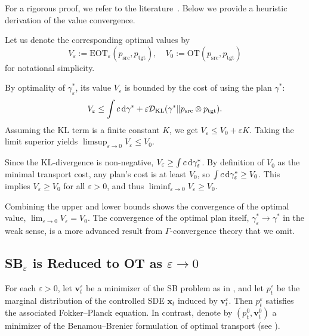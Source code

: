 {For a rigorous proof, we refer to the literature~\citep{mikami2008optimal, peyre2019computational}. Below we provide a heuristic derivation of the value convergence.

Let us denote the corresponding optimal values by
\[
V_\varepsilon := \mathrm{EOT}_\varepsilon(p_{\mathrm{src}}, p_{\mathrm{tgt}}), \quad
V_0 := \mathrm{OT}(p_{\mathrm{src}}, p_{\mathrm{tgt}})
\]
for notational simplicity. 


 By optimality of $\gamma^*_\varepsilon$, its value $V_\varepsilon$ is bounded by the cost of using the plan $\gamma^*$:
\[
    V_\varepsilon \leq \int c  \mathop{}\!\mathrm{d}\gamma^* + \varepsilon \mathcal{D}_{\text{KL}}(\gamma^* \| p_{\mathrm{src}} \otimes p_{\mathrm{tgt}}).
\]
Assuming the KL term is a finite constant $K$, we get $V_\varepsilon \leq V_0 + \varepsilon K$. Taking the limit superior yields $\limsup_{\varepsilon \to 0} V_\varepsilon \leq V_0$.

 Since the KL-divergence is non-negative, $V_\varepsilon \geq \int c  \mathop{}\!\mathrm{d}\gamma^*_\varepsilon$. By definition of $V_0$ as the minimal transport cost, any plan's cost is at least $V_0$, so $\int c  \mathop{}\!\mathrm{d}\gamma^*_\varepsilon \geq V_0$. This implies $V_\varepsilon \geq V_0$ for all $\varepsilon > 0$, and thus $\liminf_{\varepsilon \to 0} V_\varepsilon \geq V_0$.

Combining the upper and lower bounds shows the convergence of the optimal value, $\lim_{\varepsilon \to 0} V_\varepsilon = V_0$. The convergence of the optimal plan itself, $\gamma^*_\varepsilon \to \gamma^*$ in the weak sense, is a more advanced result from $\Gamma$-convergence theory that we omit.

 }





\subsection{SB$_\varepsilon$ is Reduced to OT as $\varepsilon\to 0$}\label{subsec:sb-ot}
For each $\varepsilon > 0$, let $\mathbf{v}_t^\varepsilon$ be a minimizer of the SB problem as in , and let $p_t^\varepsilon$ be the marginal distribution of the controlled SDE $\mathbf{x}_t$ induced by $\mathbf{v}_t^\varepsilon$. Then $p_t^\varepsilon$ satisfies the associated Fokker–Planck equation. In contrast, denote by $(p_t^0, \mathbf{v}_t^0)$ a minimizer of the Benamou–Brenier formulation of optimal transport (see ).

